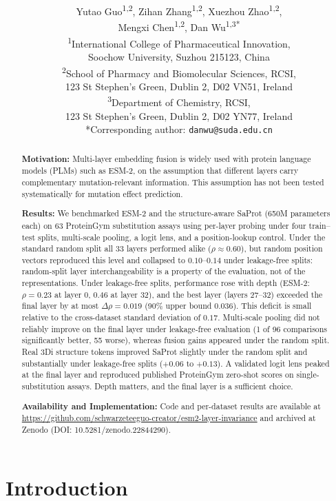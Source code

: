 \documentclass[11pt,a4paper]{article}
\title{\LARGE\bfseries \rtwo{Leakage-Free Evaluation of Layer Choice in Protein Language Models for Mutation Effect Prediction}}
\author{
\large
Yutao Guo\textsuperscript{1,2}, Zihan Zhang\textsuperscript{1,2}, Xuezhou Zhao\textsuperscript{1,2},\\[2pt]
Mengxi Chen\textsuperscript{1,2}, Dan Wu\textsuperscript{1,3*}\\[8pt]
\small
\textsuperscript{1}International College of Pharmaceutical Innovation,\\
\hspace*{1em}Soochow University, Suzhou 215123, China\\[4pt]
\textsuperscript{2}School of Pharmacy and Biomolecular Sciences, RCSI,\\
\hspace*{1em}123 St Stephen's Green, Dublin 2, D02 VN51, Ireland\\[4pt]
\textsuperscript{3}Department of Chemistry, RCSI,\\
\hspace*{1em}123 St Stephen's Green, Dublin 2, D02 YN77, Ireland\\[8pt]
*Corresponding author: \texttt{danwu@suda.edu.cn}}
\date{}
\newcommand{\rtwo}[1]{#1}
\newcommand{\rthree}[1]{#1}
\begin{document}
\maketitle

\begin{abstract}
\textbf{Motivation:} \rtwo{Multi-layer embedding fusion is widely used with protein
language models (PLMs) such as ESM-2, on the assumption that different layers carry
complementary mutation-relevant information. This assumption has not been tested
systematically for mutation effect prediction.}

\textbf{Results:} \rtwo{We benchmarked ESM-2 and the structure-aware SaProt (650M
parameters each) on 63 ProteinGym substitution assays using per-layer probing under
four train--test splits, multi-scale pooling, a logit lens, and a position-lookup
control. Under the standard random split all 33 layers performed alike
($\rho \approx 0.60$), but random position vectors reproduced this level and collapsed
to $0.10$--$0.14$ under leakage-free splits: random-split layer interchangeability is a
property of the evaluation, not of the representations. Under leakage-free splits,
performance rose with depth (ESM-2: $\rho = 0.23$ at layer 0, $0.46$ at layer 32), and
the best layer (layers 27--32) exceeded the final layer by at most
\rthree{$\Delta\rho = 0.019$ (90\% upper bound $0.036$). This deficit is small relative
to the cross-dataset standard deviation of $0.17$. Multi-scale pooling did not reliably
improve on the final layer under leakage-free evaluation (1 of 96 comparisons
significantly better, 55 worse), whereas fusion gains appeared under the random
split.} Real 3Di structure tokens improved
SaProt slightly under the random split and substantially under leakage-free splits
(\rthree{$+0.06$ to $+0.13$}). A validated logit lens peaked at the final layer and reproduced
published ProteinGym zero-shot scores on single-substitution assays. Depth matters,
and the final layer is a sufficient choice.}

\textbf{Availability and Implementation:} \rtwo{Code and per-dataset results are
available at \url{https://github.com/schwarzeteeguo-creator/esm2-layer-invariance} and
archived at Zenodo (DOI: 10.5281/zenodo.22844290).}
\end{abstract}

\section{Introduction}
\end{document}
